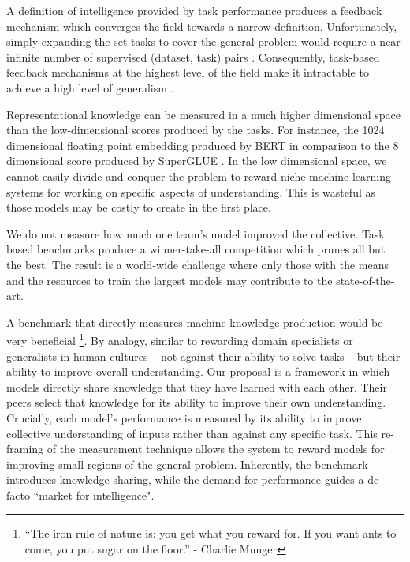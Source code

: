 \documentclass{article}
\begin{document}
\begin{enumerate}
	\item A definition of intelligence provided by task performance produces a feedback mechanism which converges the field towards a narrow definition. Unfortunately, simply expanding the set tasks to cover the general problem would require a near infinite number of supervised (dataset, task) pairs \cite{radford2019language}. Consequently, task-based feedback mechanisms at the highest level of the field make it intractable to achieve a high level of generalism \cite{chollet2019measure}. 
	
	{\color{red}\item Representational knowledge can be measured in a much higher dimensional space than the low-dimensional scores produced by the tasks. For instance, the 1024 dimensional floating point embedding produced by BERT \cite{devlin2018bert} in comparison to the 8 dimensional score produced by SuperGLUE \cite{wang2019superglue}. In the low dimensional space, we cannot easily divide and conquer the problem to reward niche machine learning systems for working on specific aspects of understanding. This is wasteful as those models may be costly to create in the first place.
	
	\item We do not measure how much one team's model improved the collective. Task based benchmarks produce a winner-take-all competition which prunes all but the best. The result is a world-wide challenge where only those with the means and the resources to train the largest models may contribute to the state-of-the-art. }
\end{enumerate}


A benchmark that directly measures machine knowledge production would be very beneficial  \footnote{“The iron rule of nature is: you get what you reward for. If you want ants to come, you put sugar on the floor.” - Charlie Munger}. By analogy, similar to rewarding domain specialists or generalists in human cultures -- not against their ability to solve tasks -- but their ability to improve overall understanding. Our proposal is a framework in which models directly share knowledge that they have learned with each other. Their peers select that knowledge for its ability to improve their own understanding. Crucially, each model's performance is measured by its ability to improve collective understanding of inputs rather than against any specific task. {\color{red} This re-framing of the measurement technique allows the system to reward models for improving small regions of the general problem. Inherently, the benchmark introduces knowledge sharing, while the demand for performance guides a de-facto ``market for intelligence".   }
\end{document}
